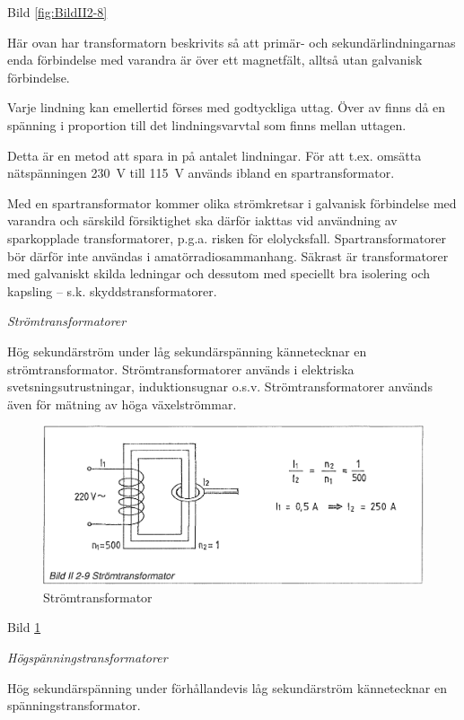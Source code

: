 Bild \ref{fig:BildII2-8}

Här ovan har transformatorn beskrivits så att primär- och sekundärlindningarnas
enda förbindelse med varandra är över ett magnetfält, alltså utan galvanisk
förbindelse.

Varje lindning kan emellertid förses med godtyckliga uttag. Över av finns då en
spänning i proportion till det lindningsvarvtal som finns mellan uttagen.

Detta är en metod att spara in på antalet lindningar. För att t.ex. omsätta
nätspänningen 230~V till 115~V används ibland en spartransformator.

Med en spartransformator kommer olika strömkretsar i galvanisk förbindelse med
varandra och särskild försiktighet ska därför iakttas vid användning av
sparkopplade transformatorer, p.g.a. risken för elolycksfall.
Spartransformatorer bör därför inte användas i amatörradiosammanhang. Säkrast
är transformatorer med galvaniskt skilda ledningar och dessutom med speciellt
bra isolering och kapsling -- s.k. skyddstransformatorer.

\emph{Strömtransformatorer}

Hög sekundärström under låg sekundärspänning kännetecknar en strömtransformator.
Strömtransformatorer används i elektriska svetsningsutrustningar,
induktionsugnar o.s.v. Strömtransformatorer används även för mätning av höga
växelströmmar.

\begin{figure}[h]
\begin{center}
\includegraphics[width=\textwidth]{images/bild_2_2-09}
\caption{Strömtransformator}
\label{fig:BildII2-9}
\end{center}
\end{figure}

Bild \ref{fig:BildII2-9}

\emph{Högspänningstransformatorer}

Hög sekundärspänning under förhållandevis låg sekundärström kännetecknar en
spänningstransformator.

